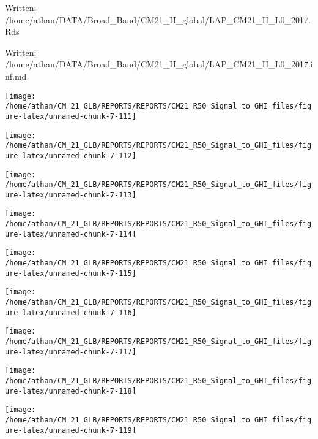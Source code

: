 \documentclass[
  11pt,
  a4paper,oneside]{article}
\begin{document}
Written: /home/athan/DATA/Broad\_Band/CM21\_H\_global/LAP\_CM21\_H\_L0\_2017.Rds

Written: /home/athan/DATA/Broad\_Band/CM21\_H\_global/LAP\_CM21\_H\_L0\_2017.inf.md

\begin{center}\texttt{[image: /home/athan/CM\_21\_GLB/REPORTS/REPORTS/CM21\_R50\_Signal\_to\_GHI\_files/figure-latex/unnamed-chunk-7-111]} \end{center}

\begin{center}\texttt{[image: /home/athan/CM\_21\_GLB/REPORTS/REPORTS/CM21\_R50\_Signal\_to\_GHI\_files/figure-latex/unnamed-chunk-7-112]} \end{center}

\begin{center}\texttt{[image: /home/athan/CM\_21\_GLB/REPORTS/REPORTS/CM21\_R50\_Signal\_to\_GHI\_files/figure-latex/unnamed-chunk-7-113]} \end{center}

\begin{center}\texttt{[image: /home/athan/CM\_21\_GLB/REPORTS/REPORTS/CM21\_R50\_Signal\_to\_GHI\_files/figure-latex/unnamed-chunk-7-114]} \end{center}

\begin{center}\texttt{[image: /home/athan/CM\_21\_GLB/REPORTS/REPORTS/CM21\_R50\_Signal\_to\_GHI\_files/figure-latex/unnamed-chunk-7-115]} \end{center}

\begin{center}\texttt{[image: /home/athan/CM\_21\_GLB/REPORTS/REPORTS/CM21\_R50\_Signal\_to\_GHI\_files/figure-latex/unnamed-chunk-7-116]} \end{center}

\begin{center}\texttt{[image: /home/athan/CM\_21\_GLB/REPORTS/REPORTS/CM21\_R50\_Signal\_to\_GHI\_files/figure-latex/unnamed-chunk-7-117]} \end{center}

\begin{center}\texttt{[image: /home/athan/CM\_21\_GLB/REPORTS/REPORTS/CM21\_R50\_Signal\_to\_GHI\_files/figure-latex/unnamed-chunk-7-118]} \end{center}

\begin{center}\texttt{[image: /home/athan/CM\_21\_GLB/REPORTS/REPORTS/CM21\_R50\_Signal\_to\_GHI\_files/figure-latex/unnamed-chunk-7-119]} \end{center}
\end{document}
